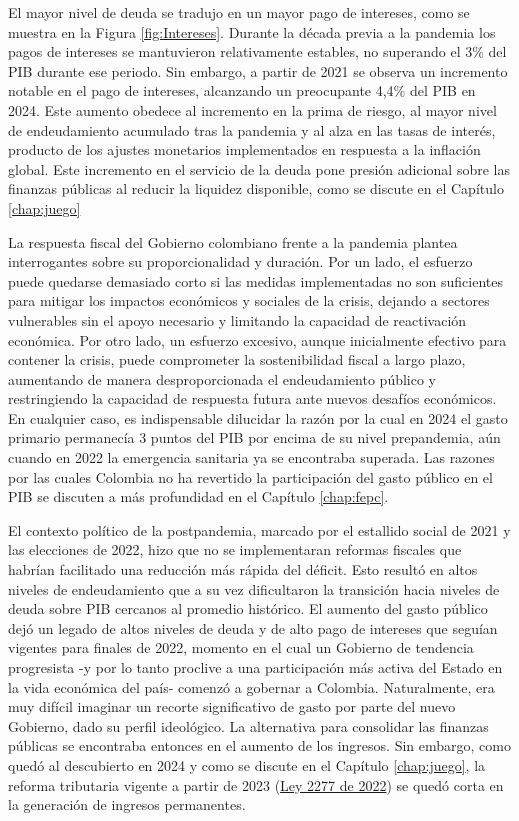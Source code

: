El mayor nivel de deuda se tradujo en un mayor pago de intereses, como se muestra en la Figura \ref{fig:Intereses}. Durante la década previa a la pandemia los pagos de intereses se mantuvieron relativamente estables, no superando el 3\% del PIB durante ese periodo. Sin embargo, a partir de 2021 se observa un incremento notable en el pago de intereses, alcanzando un preocupante 4,4\% del PIB en 2024. Este aumento obedece al incremento en la prima de riesgo, al mayor nivel de endeudamiento acumulado tras la pandemia y al alza en las tasas de interés, producto de los ajustes monetarios implementados en respuesta a la inflación global. Este incremento en el servicio de la deuda pone presión adicional sobre las finanzas públicas al reducir la liquidez disponible, como se discute en el Capítulo \ref{chap:juego} %


La respuesta fiscal del Gobierno colombiano frente a la pandemia plantea interrogantes sobre su proporcionalidad y duración. Por un lado, el esfuerzo puede quedarse demasiado corto si las medidas implementadas no son suficientes para mitigar los impactos económicos y sociales de la crisis, dejando a sectores vulnerables sin el apoyo necesario y limitando la capacidad de reactivación económica. Por otro lado, un esfuerzo excesivo, aunque inicialmente efectivo para contener la crisis, puede comprometer la sostenibilidad fiscal a largo plazo, aumentando de manera desproporcionada el endeudamiento público y restringiendo la capacidad de respuesta futura ante nuevos desafíos económicos. En cualquier caso, es indispensable dilucidar la razón por la cual en 2024 el gasto primario permanecía 3 puntos del PIB por encima de su nivel prepandemia, aún cuando en 2022 la emergencia sanitaria ya se encontraba superada. Las razones por las cuales Colombia no ha revertido la participación del gasto público en el PIB se discuten a más profundidad en el Capítulo \ref{chap:fepc}.
 
El contexto político de la postpandemia, marcado por el estallido social de 2021 y las elecciones de 2022, hizo que no se implementaran reformas fiscales que habrían facilitado una reducción más rápida del déficit. Esto resultó en altos niveles de endeudamiento que a su vez dificultaron la transición hacia niveles de deuda sobre PIB cercanos al promedio histórico. El aumento del gasto público dejó un legado de altos niveles de deuda y de alto pago de intereses que seguían vigentes para finales de 2022, momento en el cual un Gobierno de tendencia progresista -y por lo tanto proclive a una participación más activa del Estado en la vida económica del país- comenzó a gobernar a Colombia. Naturalmente, era muy difícil imaginar un recorte significativo de gasto por parte del nuevo Gobierno, dado su perfil ideológico. La alternativa para consolidar las finanzas públicas se encontraba entonces en el aumento de los ingresos. Sin embargo, como quedó al descubierto en 2024 y como se discute en el Capítulo \ref{chap:juego}, la reforma tributaria vigente a partir de 2023 (\href{https://www.funcionpublica.gov.co/eva/gestornormativo/norma.php?i=199883}{Ley 2277 de 2022}) se quedó corta en la generación de ingresos permanentes.

